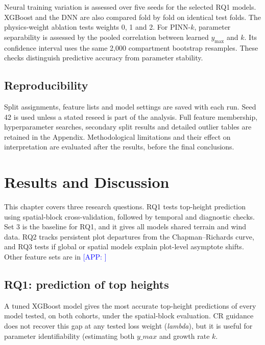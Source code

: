 \documentclass[logo,msc,ai]{infthesis}           %
\newcommand{\app}[1]{\textcolor{blue}{[APP: #1]}}
\begin{document}
Neural training variation is assessed over five seeds for the selected RQ1 models. XGBoost and the
DNN are also compared fold by fold on identical test folds. The physics-weight ablation tests
weights 0, 1 and 2. For PINN-$k$, parameter separability is assessed by the pooled correlation
between learned $y_{\max}$ and $k$. Its confidence interval uses the same 2,000 compartment
bootstrap resamples. These checks distinguish predictive accuracy from parameter stability.

\section{Reproducibility}

Split assignments, feature lists and model settings are saved with each run. Seed 42 is used unless
a stated reseed is part of the analysis. Full feature membership, hyperparameter searches,
secondary split results and detailed outlier tables are retained in the Appendix. Methodological
limitations and their effect on interpretation are evaluated after the results, before the final
conclusions.

\chapter{Results and Discussion} \label{ch:results}

This chapter covers three research questions. RQ1 tests top-height prediction using spatial-block cross-validation, followed by temporal and diagnostic checks. Set 3 is the baseline for RQ1, and it gives all models shared terrain and wind data. RQ2 tracks persistent plot departures from the Chapman–Richards curve, and RQ3 tests if global or spatial models explain plot-level asymptote shifts. Other feature sets are in \app{}

\section{RQ1: prediction of top heights} 

A tuned XGBoost model gives the most accurate top-height predictions of every model
tested, on both cohorts, under the spatial-block evaluation. CR guidance does not recover this
gap at any tested loss weight (\textit{lambda}), but it is useful for parameter identifiability (estimating both $y\_max$ and growth rate $k$. 
\end{document}
